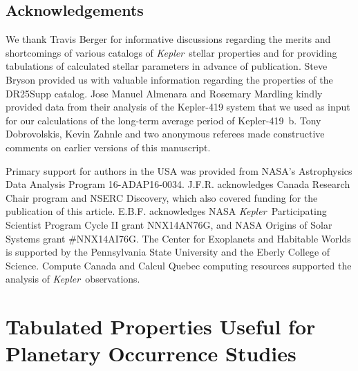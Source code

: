 \documentclass{aastex62}
\newcommand{\ik}{{\it Kepler~}}
\newcommand{\gaia}{{\it Gaia~}}
\begin{document}
\begin{acknowledgements}

\section*{Acknowledgements}
We thank Travis Berger for informative discussions regarding the merits and shortcomings of various catalogs of \ik stellar properties and for providing tabulations of calculated stellar parameters in advance of publication.
Steve Bryson provided us with valuable information regarding the properties of the DR25Supp catalog.%
Jose Manuel Almenara and Rosemary Mardling kindly provided data from their analysis of the Kepler-419 system that we used as input for our calculations of the long-term average period of Kepler-419~b.
Tony Dobrovolskis, Kevin Zahnle and two anonymous referees made constructive  comments on earlier versions of this manuscript. 

Primary support for authors in the USA was provided from NASA's Astrophysics Data Analysis Program 16-ADAP16-0034. 
J.F.R. acknowledges Canada Research Chair program and NSERC Discovery, which also covered funding for the publication of this article.
E.B.F. acknowledges NASA \ik Participating Scientist Program Cycle II grant NNX14AN76G, and NASA Origins of Solar Systems grant \#NNX14AI76G.  
The Center for Exoplanets and Habitable Worlds is supported by the Pennsylvania State University and the Eberly College of Science.  Compute Canada and Calcul Quebec computing resources supported the analysis of \ik observations.  


\end{acknowledgements}

\vspace{5mm}
\facilities{\ik space telescope}

\smallskip

\appendix

\section{Tabulated Properties Useful for Planetary Occurrence Studies}\label{sec:App_ORtables}
\end{document}
